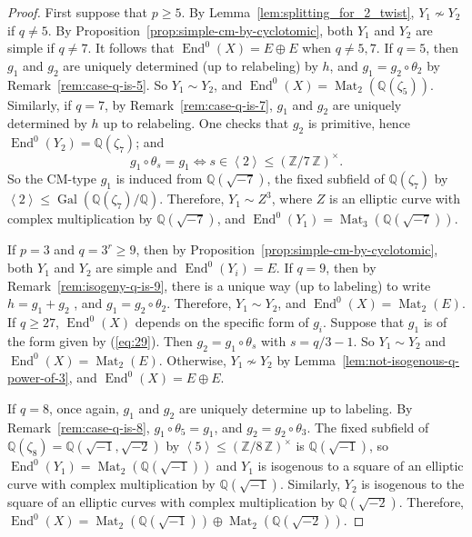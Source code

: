 \documentclass{amsart}[11pt]
\theoremstyle{definition}
\numberwithin{equation}{section}
\theoremstyle{notitle}
\begin{document}
\begin{proof}
  
  
  First suppose that $p\geq 5$. By
  Lemma~\ref{lem:splitting_for_2_twist}, $Y_1\not\sim Y_2$ if $q\neq
  5$.  By Proposition~\ref{prop:simple-cm-by-cyclotomic}, both $Y_1$
  and $Y_2$ are simple if $q\neq 7$. It follows that $\operatorname{End}^0(X)=
  E\oplus E$ when $q\neq 5, 7$. If $q=5$, then $g_1$ and $g_2$ are
  uniquely determined (up to relabeling) by $h$, and $g_1=g_2\circ
  \theta_2$ by Remark~\ref{rem:case-q-is-5}. So $Y_1\sim Y_2$, and
  $\operatorname{End}^0(X)=\operatorname{Mat}_2({\mathbb{Q}}(\zeta_5))$. Similarly, if $q=7$, by
  Remark~\ref{rem:case-q-is-7}, $g_1$ and $g_2$ are uniquely
  determined by $h$ up to relabeling. One checks that $g_2$ is
  primitive, hence $\operatorname{End}^0(Y_2)={\mathbb{Q}}(\zeta_7)$; and
  \[ g_1\circ \theta_s= g_1 \Leftrightarrow s\in {\left\langle {2} \right\rangle} \leq
  {(\mathbb{Z}/ {7}\, \mathbb{Z})^\times}.\] So the CM-type $g_1$ is induced from ${\mathbb{Q}}(\sqrt{-7})$,
  the fixed subfield of ${\mathbb{Q}}(\zeta_7)$ by ${\left\langle {2} \right\rangle}\leq
  \operatorname{Gal}({\mathbb{Q}}(\zeta_7)/{\mathbb{Q}})$.  Therefore, $Y_1\sim Z^3$, where $Z$ is an
  elliptic curve with complex multiplication by ${\mathbb{Q}}(\sqrt{-7})$, and
  $\operatorname{End}^0(Y_1)= \operatorname{Mat}_3({\mathbb{Q}}(\sqrt{-7}))$.

  If $p=3$ and $q=3^r\geq 9$, then by
  Proposition~\ref{prop:simple-cm-by-cyclotomic}, both $Y_1$ and $Y_2$
  are simple and $\operatorname{End}^0(Y_i)=E$. If $q=9$, then by
  Remark~\ref{rem:isogeny-q-is-9}, there is a unique way (up to
  labeling) to write $h=g_1+g_2$ , and $g_1=g_2\circ
  \theta_2$. Therefore, $Y_1\sim Y_2$, and $\operatorname{End}^0(X)=\operatorname{Mat}_2(E)$. If
  $q\geq 27$, $\operatorname{End}^0(X)$ depends on the specific form of
  $g_i$. Suppose that $g_1$ is of the form given by
  (\ref{eq:29}). Then $g_2= g_1\circ \theta_s$ with $s=q/3-1$. So
  $Y_1\sim Y_2$ and $\operatorname{End}^0(X)= \operatorname{Mat}_2(E)$. Otherwise, $Y_1\not\sim
  Y_2$ by Lemma~\ref{lem:not-isogenous-q-power-of-3}, and
  $\operatorname{End}^0(X)=E\oplus E$.
 
  If $q=8$, once again, $g_1$ and $g_2$ are uniquely determine up to
  labeling. By Remark~\ref{rem:case-q-is-8}, $g_1\circ \theta_5=g_1$,
  and $g_2= g_2\circ\theta_3$.  The fixed subfield of
  ${\mathbb{Q}}(\zeta_8)={\mathbb{Q}}(\sqrt{-1}, \sqrt{-2})$ by ${\left\langle {5} \right\rangle}\leq
  {(\mathbb{Z}/ {8}\, \mathbb{Z})^\times}$ is ${\mathbb{Q}}(\sqrt{-1})$, so $\operatorname{End}^0(Y_1)=
  \operatorname{Mat}_2({\mathbb{Q}}(\sqrt{-1}))$ and $Y_1$ is isogenous to a square of an
  elliptic curve with complex multiplication by
  ${\mathbb{Q}}(\sqrt{-1})$. Similarly, $Y_2$ is isogenous to the square of an
  elliptic curves with complex multiplication by
  ${\mathbb{Q}}(\sqrt{-2})$. Therefore, $\operatorname{End}^0(X)= \operatorname{Mat}_2({\mathbb{Q}}(\sqrt{-1}))\oplus
    \operatorname{Mat}_2({\mathbb{Q}}(\sqrt{-2}))$.


\end{proof}
\end{document}
